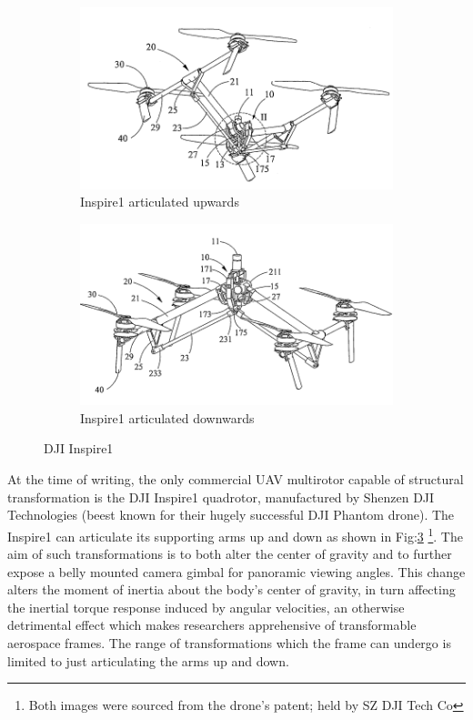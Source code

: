 \begin{figure}[hbtp]
\centering
\begin{subfigure}{.5\textwidth}
\centering
\includegraphics[width=\textwidth]{figs/dji-inspire1}
\caption{Inspire1 articulated upwards}
\label{fig:inspireup}
\end{subfigure}%
\begin{subfigure}{.5\textwidth}
\centering
\includegraphics[width=\textwidth]{figs/dji-inspire2}
\caption{Inspire1 articulated downwards}
\label{fig:inspiredown}
\end{subfigure}
\caption{DJI Inspire1}
\label{fig:inspire1}
\end{figure}
At the time of writing, the only commercial UAV multirotor capable of structural transformation is the DJI Inspire1 quadrotor\cite{inspire}, manufactured by Shenzen DJI Technologies (beest known for their hugely successful DJI Phantom drone\cite{phantom}). The Inspire1 can articulate its supporting arms up and down as shown in Fig:\ref{fig:inspire1} \footnote{Both images were sourced from the drone's patent; held by SZ DJI Tech Co\cite{djinspire}}. The aim of such transformations is to both alter the center of gravity and to further expose a belly mounted camera gimbal for panoramic viewing angles. This change alters the moment of inertia about the body's center of gravity, in turn affecting the inertial torque response induced by angular velocities, an otherwise detrimental effect which makes researchers apprehensive of transformable aerospace frames. The range of transformations which the frame can undergo is limited to just articulating the arms up and down.
